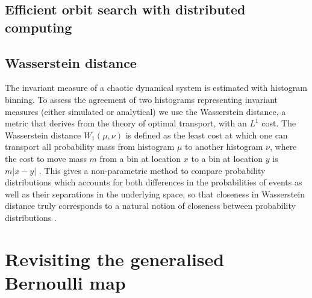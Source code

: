 \subsection{Efficient orbit search with distributed computing}
\label{sec:distributed_orbit_search}

\subsection{Wasserstein distance}
\label{sec:wasserstein}

The invariant measure of a chaotic dynamical system is estimated with histogram binning. To assess the agreement
of two histograms representing invariant measures (either simulated or analytical) we use the Wasserstein distance,
a metric that derives from the theory of optimal transport, with an $L^1$ cost. The Wasserstein distance $W_1(\mu,\nu)$
is defined as the least cost at which one can transport all probability mass from histogram $\mu$ to another histogram $\nu$,
where the cost to move mass $m$ from a bin at location $x$ to a bin at location $y$ is $m \vert x-y \vert$ \citep{Paxton2021,Villani2003}.
This gives a non-parametric method to compare probability distributions which accounts for both differences in the probabilities
of events as well as their separations in the underlying space, so that closeness in Wasserstein distance truly corresponds
to a natural notion of closeness between probability distributions \citep[Thm 7.12]{Villani2003}.

\section{Revisiting the generalised Bernoulli map}
\label{sec:revisit_bernoulli}

